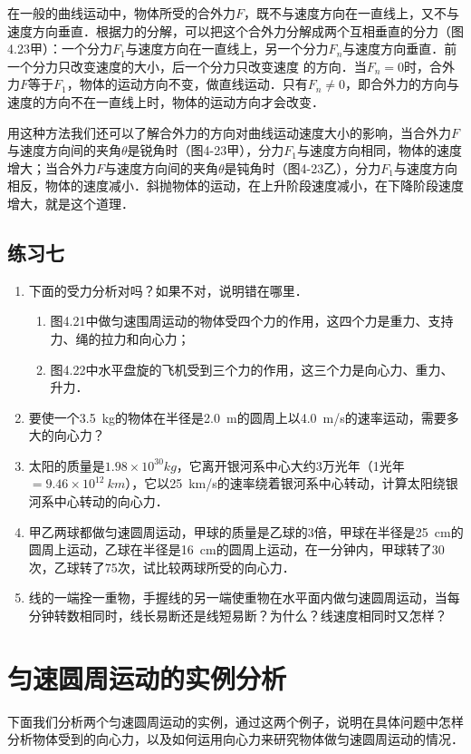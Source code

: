 在一般的曲线运动中，物体所受的合外力$F$，既不与速度方向在一直线上，又不与速度方向垂直．根据力的分解，可以把这个合外力分解成两个互相垂直的分力（图4.23甲）：一个分力$F_1$与速度方向在一直线上，另一个分力$F_n$与速度方向垂直．前一个分力只改变速度的大小，后一个分力只改变速度
的方向．当$F_n=0$时，合外力$F$等于$F_1$，物体的运动方向不变，做直线运动．只有$F_n\ne 0$，即合外力的方向与速度的方向不在一直线上时，物体的运动方向才会改变．

用这种方法我们还可以了解合外力的方向对曲线运动速度大小的影响，当合外力$F$与速度方向间的夹角$\theta$是锐角时（图4-23甲），分力$F_1$与速度方向相同，物体的速度增大；当合外力$F$与速度方向间的夹角$\theta$是钝角时（图4-23乙），分力$F_1$与速度方向相反，物体的速度减小．斜抛物体的运动，在上升阶段速度减小，在下降阶段速度增大，就是这个道理．

\subsection*{练习七}
\begin{enumerate}
    \item 下面的受力分析对吗？如果不对，说明错在哪里．
          \begin{enumerate}
              \item 图4.21中做匀速围周运动的物体受四个力的作用，这四个力是重力、支持力、绳的拉力和向心力；
              \item 图4.22中水平盘旋的飞机受到三个力的作用，这三个力是向心力、重力、升力．
          \end{enumerate}
    \item 要使一个\SI{3.5}{kg}的物体在半径是\SI{2.0}{m}的圆周上以\SI{4.0}{m/s}的速率运动，需要多大的向心力？
    \item 太阳的质量是$1.98\times 10^{30}\si{kg}$，它离开银河系中心大约3万光年（1光年$=9.46\times 10^{12}~\si{km}$），它以\SI{25}{km/s}的速率绕着银河系中心转动，计算太阳绕银河系中心转动的向心力．
    \item 甲乙两球都做匀速圆周运动，甲球的质量是乙球的3倍，甲球在半径是\SI{25}{cm}的圆周上运动，乙球在半径是\SI{16}{cm}的圆周上运动，在一分钟内，甲球转了30次，乙球转了75次，试比较两球所受的向心力．
    \item 线的一端拴一重物，手握线的另一端使重物在水平面内做匀速圆周运动，当每分钟转数相同时，线长易断还是线短易断？为什么？线速度相同时又怎样？
\end{enumerate}
\newpage

\section{匀速圆周运动的实例分析}
下面我们分析两个匀速圆周运动的实例，通过这两个例子，说明在具体问题中怎样分析物体受到的向心力，以及如何运用向心力来研究物体做匀速圆周运动的情况．

